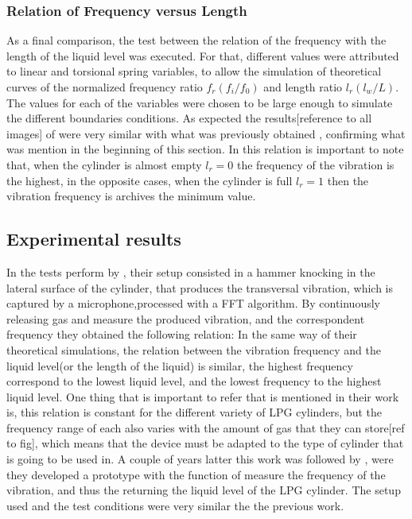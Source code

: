     \subsubsection{Relation of Frequency versus Length}
    As a final comparison, the test between the relation of the frequency with the length of the liquid level was executed. For that, different values were attributed to linear and torsional spring variables, to allow the simulation of theoretical curves of the normalized frequency ratio $f_r (f_i/f_0)$ and length ratio $l_r (l_w/L)$. The values for each of the variables were chosen to be large enough to simulate the different boundaries conditions. As expected the results[reference to all images] of \citeauthor{wuLiquidLevelDetector2014b} were very similar with what was previously obtained \cite{chanFreeVibrationCantilever1995}\cite{chanFREEVIBRATIONSIMPLY1996}\cite{jacobsContactlessLiquidDetection2005}, confirming what was mention in the beginning of this section.
    In this relation is important to note that, when the cylinder is almost empty $l_r = 0$ the frequency of the vibration is the highest, in the opposite cases, when the cylinder is full $l_r = 1$ then the vibration frequency is archives the minimum value. 
\subsection{Experimental results}
In the tests perform by \citeauthor{wuLiquidLevelDetector2014b}\cite{wuLiquidLevelDetector2014b}, their setup consisted in a hammer knocking in the lateral surface of the cylinder, that produces the transversal vibration, which is captured by a microphone,processed with a FFT algorithm. By continuously releasing gas and measure the produced vibration, and the correspondent frequency they obtained the following relation: 
In the same way of their theoretical simulations, the relation between the vibration frequency and the liquid level(or the length of the liquid) is similar, the highest frequency correspond to the lowest liquid level, and the lowest frequency to the highest liquid level. One thing that is important to refer that is mentioned in their work is, this relation is constant for the different variety of LPG cylinders, but the frequency range of each also varies with the amount of gas that they can store[ref to fig], which means that the device must be adapted to the type of cylinder that is going to be used in. 
A couple of years latter this work was followed by \citeauthor{wuAnalysisImplementationNoncontact2016a}\cite{wuAnalysisImplementationNoncontact2016a}, were they developed a prototype with the function of measure the frequency of the vibration, and thus the returning the liquid level of the LPG cylinder. The setup used and the test conditions were very similar the the previous work.

\clearpage
\printbibliography[heading=subbibliography]
